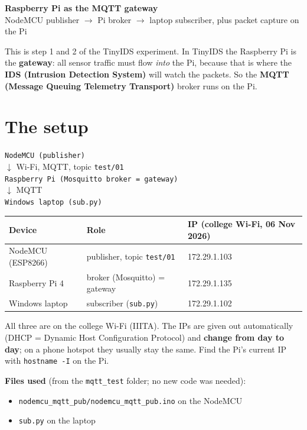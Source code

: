 \documentclass[11pt]{article}
\begin{document}
{\LARGE\bfseries Raspberry Pi as the MQTT gateway}\\[4pt]
{\large NodeMCU publisher $\rightarrow$ Pi broker $\rightarrow$ laptop subscriber, plus packet capture on the Pi}

\vspace{6pt}
This is step 1 and 2 of the TinyIDS experiment. In TinyIDS the Raspberry Pi is the \textbf{gateway}: all sensor traffic must flow \emph{into} the Pi,
because that is where the \textbf{IDS (Intrusion Detection System)} will watch the packets. So the \textbf{MQTT (Message Queuing Telemetry Transport)} broker runs on the Pi.

\section*{The setup}
\begin{center}
\texttt{NodeMCU (publisher)}\\
$\downarrow$ {\small Wi-Fi, MQTT, topic \texttt{test/01}}\\
\texttt{Raspberry Pi (Mosquitto broker = gateway)}\\
$\downarrow$ {\small MQTT}\\
\texttt{Windows laptop (sub.py)}
\end{center}

\begin{tabular}{@{}l l l@{}}
\toprule
\textbf{Device} & \textbf{Role} & \textbf{IP (college Wi-Fi, 06 Nov 2026)} \\
\midrule
NodeMCU (ESP8266) & publisher, topic \texttt{test/01} & 172.29.1.103 \\
Raspberry Pi 4 & broker (Mosquitto) = gateway & 172.29.1.135 \\
Windows laptop & subscriber (\texttt{sub.py}) & 172.29.1.102 \\
\bottomrule
\end{tabular}

All three are on the college Wi-Fi (IIITA). The IPs are given out automatically (DHCP = Dynamic Host Configuration Protocol) and
\textbf{change from day to day}; on a phone hotspot they usually stay the same. Find the Pi's current IP with \texttt{hostname -I} on the Pi.

\textbf{Files used} (from the \texttt{mqtt\_test} folder; no new code was needed):
\begin{itemize}
\item \texttt{nodemcu\_mqtt\_pub/nodemcu\_mqtt\_pub.ino} on the NodeMCU
\item \texttt{sub.py} on the laptop
\end{itemize}
\end{document}

